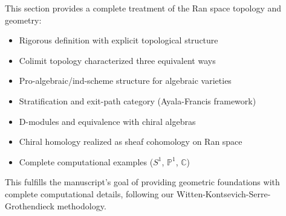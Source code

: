 \begin{remark}
This section provides a complete treatment of the Ran space topology and geometry:
\begin{itemize}
\item Rigorous definition with explicit topological structure
\item Colimit topology characterized three equivalent ways
\item Pro-algebraic/ind-scheme structure for algebraic varieties
\item Stratification and exit-path category (Ayala-Francis framework)
\item D-modules and equivalence with chiral algebras
\item Chiral homology realized as sheaf cohomology on Ran space
\item Complete computational examples ($S^1$, $\mathbb{P}^1$, $\mathbb{C}$)
\end{itemize}

This fulfills the manuscript's goal of providing geometric foundations with complete 
computational details, following our Witten-Kontsevich-Serre-Grothendieck methodology.
\end{remark}

